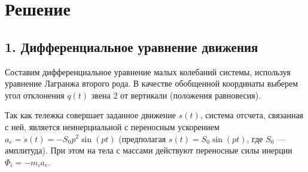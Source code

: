 \documentclass{article}
\begin{document}
\section*{Решение}
\subsection*{1. Дифференциальное уравнение движения}
Составим дифференциальное уравнение малых колебаний системы, используя уравнение Лагранжа второго рода. В качестве обобщенной координаты выберем угол отклонения $q(t)$ звена 2 от вертикали (положения равновесия).

Так как тележка совершает заданное движение $s(t)$, система отсчета, связанная с ней, является неинерциальной с переносным ускорением $a_e = \ddot{s}(t) = -S_0 p^2 \sin(pt)$ (предполагая $s(t) = S_0 \sin(pt)$, где $S_0$ --- амплитуда). При этом на тела с массами действуют переносные силы инерции $\Phi_i = -m_i a_e$.
\end{document}
